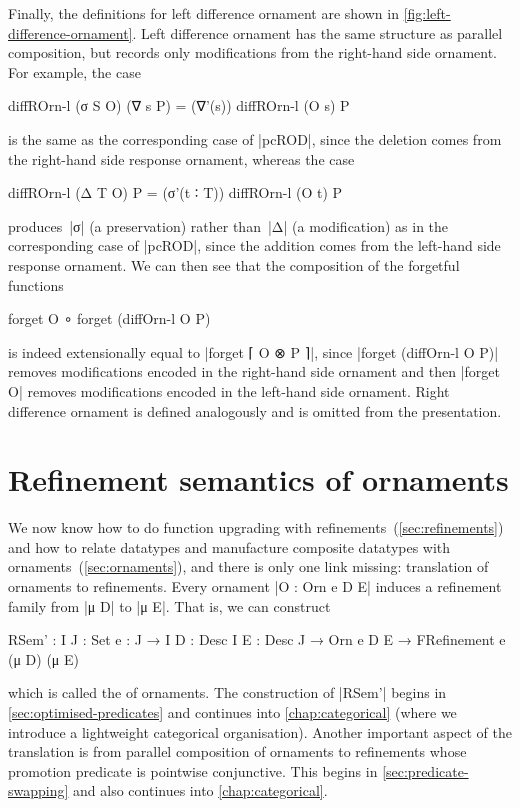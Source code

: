 Finally, the definitions for left difference ornament are shown in \autoref{fig:left-difference-ornament}.
Left difference ornament has the same structure as parallel composition, but records only modifications from the right-hand side ornament.
For example, the case
\begin{code}
diffROrn-l (σ S O) (∇ s P) = (∇'(s)) diffROrn-l (O s) P
\end{code}
is the same as the corresponding case of |pcROD|, since the deletion comes from the right-hand side response ornament, whereas the case
\begin{code}
diffROrn-l (Δ T O) P = (σ'(t ∶ T)) diffROrn-l (O t) P
\end{code}
produces~|σ| (a preservation) rather than~|Δ| (a modification) as in the corresponding case of |pcROD|, since the addition comes from the left-hand side response ornament.
We can then see that the composition of the forgetful functions
\begin{code}
forget O ∘ forget (diffOrn-l  O P)
\end{code}
is indeed extensionally equal to |forget ⌈ O ⊗ P ⌉|, since |forget (diffOrn-l O P)| removes modifications encoded in the right-hand side ornament and then |forget O| removes modifications encoded in the left-hand side ornament.
Right difference ornament is defined analogously and is omitted from the presentation.

\section{Refinement semantics of ornaments}
\label{sec:refinement-semantics}

We now know how to do function upgrading with refinements~(\autoref{sec:refinements}) and how to relate datatypes and manufacture composite datatypes with ornaments~(\autoref{sec:ornaments}), and there is only one link missing: translation of ornaments to refinements.
Every ornament |O : Orn e D E| induces a refinement family from |μ D| to |μ E|.
That is, we can construct
\begin{code}
RSem' :  {I J : Set} {e : J → I} {D : Desc I} {E : Desc J} →
         Orn e D E → FRefinement e (μ D) (μ E)
\end{code}
which is called the  of ornaments.
The construction of |RSem'| begins in \autoref{sec:optimised-predicates} and continues into \autoref{chap:categorical} (where we introduce a lightweight categorical organisation).
Another important aspect of the translation is from parallel composition of ornaments to refinements whose promotion predicate is pointwise conjunctive.
This begins in \autoref{sec:predicate-swapping} and also continues into \autoref{chap:categorical}.



